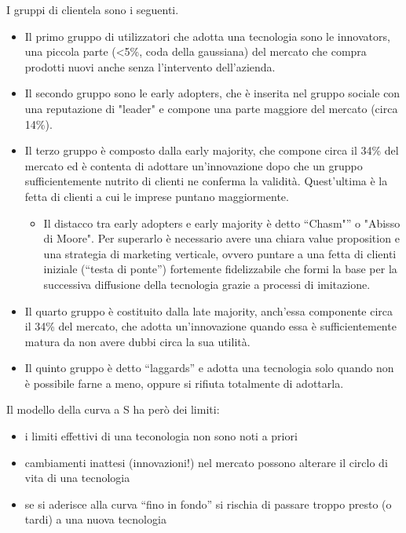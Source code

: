 \documentclass[answers, a4paper, 11pt]{exam}
\begin{document}
I gruppi di clientela sono i seguenti.

\begin{itemize}
    \item Il primo gruppo di utilizzatori che adotta una tecnologia sono le innovators, una piccola parte (<5\%, coda della gaussiana) del mercato che compra prodotti nuovi anche senza l'intervento dell'azienda.

\item Il secondo gruppo sono le early adopters, che è inserita nel gruppo sociale con una reputazione di "leader" e compone una parte maggiore del mercato (circa 14\%).

\item Il terzo gruppo è composto dalla early majority, che compone circa il 34\% del mercato ed è contenta di adottare un'innovazione dopo che un gruppo sufficientemente nutrito di clienti ne conferma la validità. Quest'ultima è la fetta di clienti a cui le imprese puntano maggiormente.
\begin{itemize}
\item Il distacco tra early adopters e early majority è detto ``Chasm"'' o "Abisso di Moore". Per superarlo è necessario avere una chiara value proposition e una strategia di marketing verticale, ovvero puntare a una fetta di clienti iniziale (``testa di ponte'') fortemente fidelizzabile che formi la base per la successiva diffusione della tecnologia grazie a processi di imitazione.
\end{itemize}
\item Il quarto gruppo è costituito dalla late majority, anch'essa componente circa il 34\% del mercato, che adotta un'innovazione quando essa è sufficientemente matura da non avere dubbi circa la sua utilità.

\item Il quinto gruppo è detto ``laggards'' e adotta una tecnologia solo quando non è possibile farne a meno, oppure si rifiuta totalmente di adottarla.
\end{itemize}

Il modello della curva a S ha però dei limiti:
\begin{itemize}
    \item i limiti effettivi di una teconologia non sono noti a priori
    \item cambiamenti inattesi (innovazioni!) nel mercato possono alterare il circlo di vita di una tecnologia
    \item se si aderisce alla curva ``fino in fondo'' si rischia di passare troppo presto (o tardi) a una nuova tecnologia
\end{itemize}
\end{document}
